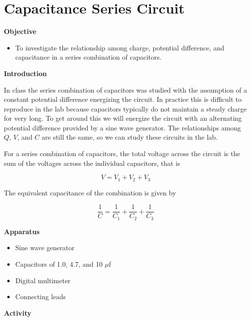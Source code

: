 
\section{Capacitance Series Circuit}

\makelabheader %

\textbf{Objective}

\begin{itemize}
\item To investigate the relationship among charge, potential difference, and capacitance in a series combination of capacitors.
\end{itemize}
\textbf{Introduction} 

In class the series combination of capacitors was studied with the assumption
of a constant potential difference energizing the circuit.  In practice this
is difficult to reproduce in the lab because capacitors typically do not
maintain a steady charge for very long.  To get around this we will energize
the circuit with an alternating potential difference provided by a sine wave
generator.  The relationships among $Q$, $V$, and $C$ are still the same, so
we can study these circuits in the lab.

For a series combination of capacitors, the total voltage across the circuit
is the sum of the voltages across the individual capacitors, that is

\begin{displaymath} V = V_1 + V_2 + V_3 \end{displaymath}

The equivalent capacitance of the combination is given by

\begin{displaymath} \frac{1}{C} = \frac{1}{C_1} + \frac{1}{C_2} + \frac{1}{C_3} \end{displaymath}

\textbf{Apparatus}

\begin{itemize}
\item Sine wave generator 
\item Capacitors of 1.0, 4.7, and 10 $\mu$f
\item Digital multimeter
\item Connecting leads
\end{itemize}
\textbf{Activity}


